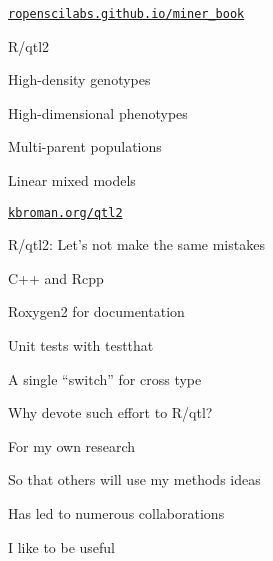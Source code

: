\documentclass[12pt,t,aspectratio=169]{beamer}
\begin{document}
\begin{frame}[c]{}

  \vspace*{5mm}



\vspace{3mm}

\hfill \href{https://ropenscilabs.github.io/miner_book}{\scriptsize \lolit \tt ropenscilabs.github.io/miner\_book}

\end{frame}



\begin{frame}[c]{R/qtl2}

\vspace*{-16.2mm}

  \vspace{21mm}

  \bbi
\item High-density genotypes
\item High-dimensional phenotypes
\item Multi-parent populations
\item Linear mixed models
  \ei

  \vspace{25mm}

\hfill \href{https://kbroman.org/qtl2}{\small \tt kbroman.org/qtl2}

\end{frame}



\begin{frame}[c]{R/qtl2: \color{foreground} Let's not make the same mistakes}

  \bbi
{
\item C++ and Rcpp
\item Roxygen2 for documentation
\item Unit tests with testthat
\item A single ``switch'' for cross type
}
\ei

\end{frame}



\begin{frame}{Why devote such effort to R/qtl?}

  \bbi
\item For my own research
\item So that others will use my methods ideas
\item Has led to numerous collaborations
\item I like to be useful
  \ei

\end{frame}
\end{document}
